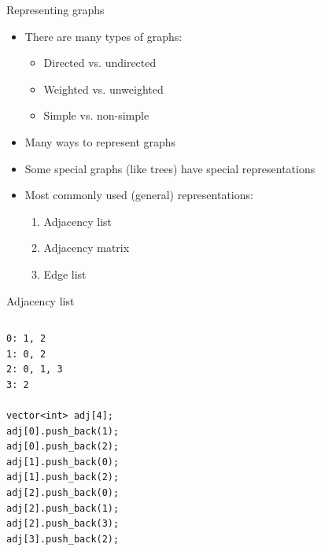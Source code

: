 \documentclass[10pt]{beamer}
\newcommand{\bi}{\begin{itemize}}
\newcommand{\ei}{\end{itemize}}
\begin{document}
\begin{frame}{Representing graphs}
    \vspace{20pt}
    \bi
        \item There are many types of graphs:
            \bi
                \item Directed vs. undirected
                \item Weighted vs. unweighted
                \item Simple vs. non-simple
            \ei
        \item Many ways to represent graphs
        \item Some special graphs (like trees) have special representations
        \item Most commonly used (general) representations:
            \begin{enumerate}
                \item Adjacency list
                \item Adjacency matrix
                \item Edge list
            \end{enumerate}
    \ei
\end{frame}

\begin{frame}[fragile]{Adjacency list}

    \begin{columns}[T]
        \begin{column}{.4\textwidth}
            \begin{verbatim}
0: 1, 2
1: 0, 2
2: 0, 1, 3
3: 2

vector<int> adj[4];
adj[0].push_back(1);
adj[0].push_back(2);
adj[1].push_back(0);
adj[1].push_back(2);
adj[2].push_back(0);
adj[2].push_back(1);
adj[2].push_back(3);
adj[3].push_back(2);
            \end{verbatim}
        \end{column}%
        \hfill%
        \begin{column}{.4\textwidth}
            \begin{figure}
            \end{figure}
        \end{column}%
    \end{columns}
\end{frame}
\end{document}
